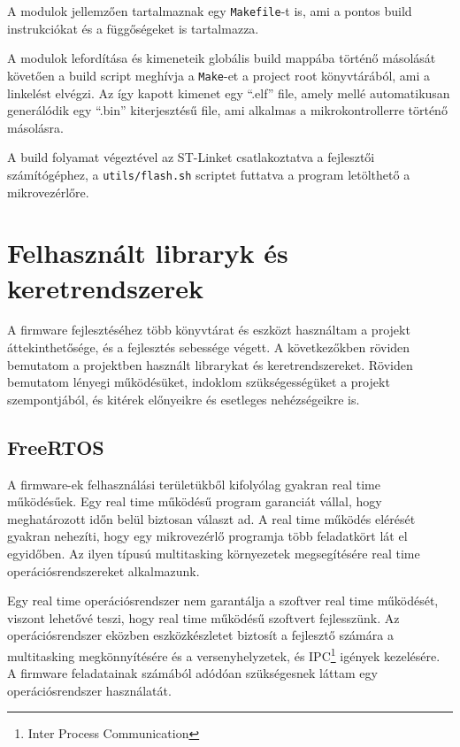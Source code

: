 A modulok jellemzően tartalmaznak egy \verb|Makefile|-t is, ami a pontos build
instrukciókat és a függőségeket is tartalmazza.

A modulok lefordítása és kimeneteik globális build mappába történő másolását
követően a build script meghívja a \verb|Make|-et a project root könyvtárából, ami a
linkelést elvégzi. Az így kapott kimenet egy ``.elf'' file, amely mellé
automatikusan generálódik egy ``.bin'' kiterjesztésű file, ami alkalmas a
mikrokontrollerre történő másolásra.

\medskip

A build folyamat végeztével az ST-Linket csatlakoztatva a fejlesztői
számítógéphez, a \verb|utils/flash.sh| scriptet futtatva a program letölthető a
mikrovezérlőre. 

\section{Felhasznált libraryk és keretrendszerek}

A firmware fejlesztéséhez több könyvtárat és eszközt használtam a projekt
áttekinthetősége, és a fejlesztés sebessége végett. A következőkben röviden
bemutatom a projektben használt librarykat és keretrendszereket. Röviden
bemutatom lényegi működésüket, indoklom szükségességüket a projekt szempontjából,
és kitérek előnyeikre és esetleges nehézségeikre is.

\subsection{FreeRTOS}

A firmware-ek felhasználási területükből kifolyólag gyakran real time
működésűek. Egy real time működésű program garanciát vállal, hogy meghatározott
időn belül biztosan választ ad. A real time működés elérését gyakran
nehezíti, hogy egy mikrovezérlő programja több feladatkört lát el egyidőben. Az
ilyen típusú multitasking környezetek megsegítésére real time
operációsrendszereket alkalmazunk.

Egy real time operációsrendszer nem garantálja a szoftver real time működését,
viszont lehetővé teszi, hogy real time működésű szoftvert fejlesszünk. Az
operációsrendszer eközben eszközkészletet biztosít a fejlesztő számára
a multitasking megkönnyítésére és a versenyhelyzetek, és IPC\footnote{Inter
Process Communication} igények kezelésére. A firmware feladatainak
számából adódóan szükségesnek láttam egy operációsrendszer használatát.

